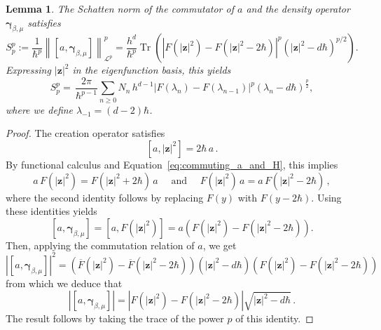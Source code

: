 \documentclass[11pt]{amsart}
\theoremstyle{plain}
\newtheorem{lem}[theorem]{Lemma}
\theoremstyle{definition}
\renewcommand	{\L}		{\mathcal L}		%
\newcommand		{\lt}			{\left}				%
\newcommand		{\rt}			{\right}			%
\renewcommand	{\(}			{\lt(}
\renewcommand	{\)}			{\rt)}
\newcommand		{\com}[1]		{\lt[{#1}\rt]}		%
\newcommand		{\n}[1]			{\lt\lvert #1 \rt\rvert}
\newcommand		{\nrm}[1]		{\lt\lVert #1\rt\rVert}
\newcommand		{\Nrm}[2]		{\nrm{#1}_{#2}}
\newcommand			{\conj}[1]	{\overline{#1}}		%
\DeclareMathOperator{\tr}		{Tr}				%
\newcommand		{\Tr}[1]		{\tr\!\( #1 \)}		%
\newcommand		{\hd}		{h^d}
\newcommand		{\opgam}	{{\boldsymbol{\gamma}}}	%
\newcommand		{\opz}		{\mathbf{z}}%
\begin{document}
	\begin{lem}\label{lem:harmonic_S^p_p}
		The Schatten norm of the commutator of $a$ and the density operator $\opgam_{\beta,\mu}$ satisfies
		\begin{equation*}
			S_p^p := \frac{1}{\hbar^p}\Nrm{\com{a,\opgam_{\beta, \mu}}}{\L^p}^p = \frac{\hd}{\hbar^p} \Tr{\n{F(\n{\opz}^2) - F(\n{\opz}^2-2\hbar)}^p \lt(\n{\opz}^2-d\hbar\rt)^{p/2}} .
		\end{equation*}
		Expressing $\n{\opz}^2$ in the eigenfunction basis, this yields
		\begin{equation}\label{def:Schatten_commutation_with_eta}
			S_p^p =\, \frac{2\pi}{\hbar^{p-1}}\sum_{n\geq 0} N_n\, h^{d-1} \n{F(\lambda_n) - F(\lambda_{n-1})}^p \lt(\lambda_n-d\hbar\rt)^\frac{p}{2} ,
		\end{equation}
		where we define $\lambda_{-1} = \lt(d-2\rt)\hbar$.
	\end{lem}
	
	\begin{proof}
		The creation operator satisfies
		\begin{equation}\label{eq:commuting_a_and_H}
			\com{a, \n{\opz}^2} = 2\hbar\, a\,.
		\end{equation}
		By functional calculus and Equation~\eqref{eq:commuting_a_and_H}, this implies
		\begin{equation*} %
			a\,F(\n{\opz}^2) = F(\n{\opz}^2+2\hbar)\,a \quad \text{ and } \quad F(\n{\opz}^2)\,a = a\,F(\n{\opz}^2-2\hbar)\,,
		\end{equation*}
		where the second identity follows by replacing $F(y)$ with $F(y-2\hbar)$. Using these identities yields
		\begin{equation*}
			\com{a,\opgam_{\beta, \mu}} = \com{a,F(\n{\opz}^2)} = a \lt(F(\n{\opz}^2) - F(\n{\opz}^2-2\hbar)\rt).
		\end{equation*}
		Then, applying the commutation relation of $a$, we get
		\begin{equation*}
			\n{\com{a,\opgam_{\beta, \mu}}}^2 = \lt(\conj{F}(\n{\opz}^2) - \conj{F}(\n{\opz}^2-2\hbar)\rt) \lt(\n{\opz}^2-d\hbar\rt) \lt(F(\n{\opz}^2) - F(\n{\opz}^2-2\hbar)\rt)
		\end{equation*}
		from which we deduce that
		\begin{equation*}
			\n{\com{a,\opgam_{\beta, \mu}}} = \n{F(\n{\opz}^2) - F(\n{\opz}^2-2\hbar)} \sqrt{\n{\opz}^2-d\hbar}\,.
		\end{equation*}
		The result follows by taking the trace of the power $p$ of this identity.
	\end{proof}
\end{document}
